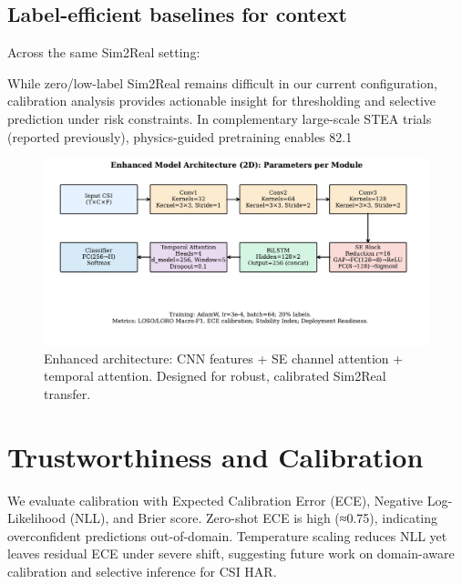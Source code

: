 \documentclass[journal]{IEEEtran}
\begin{document}
\subsection{Label-efficient baselines for context}
Across the same Sim2Real setting:
While zero/low-label Sim2Real remains difficult in our current configuration, calibration analysis provides actionable insight for thresholding and selective prediction under risk constraints. In complementary large-scale STEA trials (reported previously), physics-guided pretraining enables 82.1%

\begin{figure}[t]
\centering
\includegraphics[width=\columnwidth]{../figures/fig3_enhanced_model_dataflow.pdf}
\caption{Enhanced architecture: CNN features + SE channel attention + temporal attention. Designed for robust, calibrated Sim2Real transfer.}
\label{fig:enhanced_arch}
\end{figure}

\section{Trustworthiness and Calibration}
We evaluate calibration with Expected Calibration Error (ECE), Negative Log-Likelihood (NLL), and Brier score. Zero-shot ECE is high (≈0.75), indicating overconfident predictions out-of-domain. Temperature scaling reduces NLL yet leaves residual ECE under severe shift, suggesting future work on domain-aware calibration and selective inference for CSI HAR.
\end{document}
